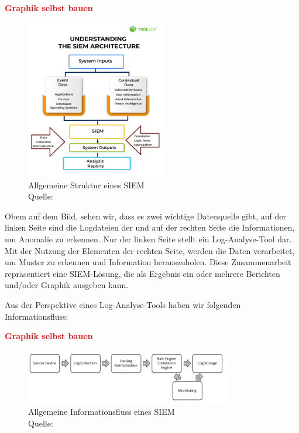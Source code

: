 \textbf{\textcolor{red}{Graphik selbst bauen}}

\begin{figure}[H]
   \centering
   \includegraphics[width=0.55\textwidth]{assets/2_p1.png}
   \caption[Allgemeine Struktur von \gls{SIEM}]
   {Allgemeine Struktur eines \gls{SIEM}\\Quelle: \citep{Mohanan_What} }
   \label{fig:SIEM_Allg_Struktur}
   \centering
\end{figure}

Obem auf dem Bild, sehen wir, dass es zwei wichtige Datenquelle gibt, auf der linken Seite sind die Logdateien der  und auf der rechten Seite die Informationen, um Anomalie zu erkennen. Nur der linken Seite stellt ein Log-Analyse-Tool dar. Mit der Nutzung der Elementen der rechten Seite, werden die Daten verarbeitet, um Muster zu erkennen und Information herauszuholen. Diese Zusammenarbeit repräsentiert eine \gls{SIEM}-Lösung, die als Ergebnis ein oder mehrere Berichten und/oder Graphik ausgeben kann. 

Aus der Perspektive eines Log-Analyse-Tools haben wir folgenden Informationsfluss:

\textbf{\textcolor{red}{Graphik selbst bauen}}

\begin{figure}[H]
   \centering
   \includegraphics[width=0.8\textwidth]{assets/2_p2.png}
   \caption[Allgemeine Informationsfluss von \gls{SIEM}]
   {Allgemeine Informationsfluss eines \gls{SIEM} \\Quelle: \citep{Granadillo_SIEM} }
   \label{fig:SIEM_Allg_Informationsfluss}
   \centering
\end{figure}


